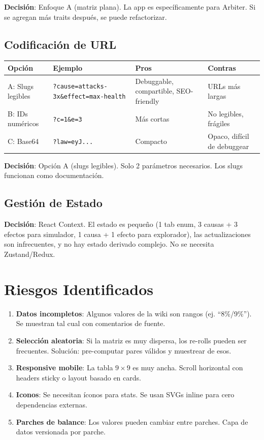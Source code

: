 \documentclass[11pt,a4paper]{report}
\begin{document}
\textbf{Decisión}: Enfoque A (matriz plana). La app es específicamente para Arbiter. Si se agregan más traits después, se puede refactorizar.

\subsection{Codificación de URL}

\begin{table}[h]
\centering
\begin{tabular}{@{}lXll@{}}
\toprule
\textbf{Opción} & \textbf{Ejemplo} & \textbf{Pros} & \textbf{Contras} \\
\midrule
A: Slugs legibles & \texttt{?cause=attacks-3x\&effect=max-health} & Debuggable, compartible, SEO-friendly & URLs más largas \\
B: IDs numéricos & \texttt{?c=1\&e=3} & Más cortas & No legibles, frágiles \\
C: Base64 & \texttt{?law=eyJ...} & Compacto & Opaco, difícil de debuggear \\
\bottomrule
\end{tabular}
\end{table}

\textbf{Decisión}: Opción A (slugs legibles). Solo 2 parámetros necesarios. Los slugs funcionan como documentación.

\subsection{Gestión de Estado}

\textbf{Decisión}: React Context. El estado es pequeño (1 tab enum, 3 causas + 3 efectos para simulador, 1 causa + 1 efecto para explorador), las actualizaciones son infrecuentes, y no hay estado derivado complejo. No se necesita Zustand/Redux.

\section{Riesgos Identificados}

\begin{enumerate}
  \item \textbf{Datos incompletos}: Algunos valores de la wiki son rangos (ej. ``8\%/9\%''). Se muestran tal cual con comentarios de fuente.
  \item \textbf{Selección aleatoria}: Si la matriz es muy dispersa, los re-rolls pueden ser frecuentes. Solución: pre-computar pares válidos y muestrear de esos.
  \item \textbf{Responsive mobile}: La tabla $9 \times 9$ es muy ancha. Scroll horizontal con headers sticky o layout basado en cards.
  \item \textbf{Iconos}: Se necesitan íconos para stats. Se usan SVGs inline para cero dependencias externas.
  \item \textbf{Parches de balance}: Los valores pueden cambiar entre parches. Capa de datos versionada por parche.
\end{enumerate}
\end{document}
